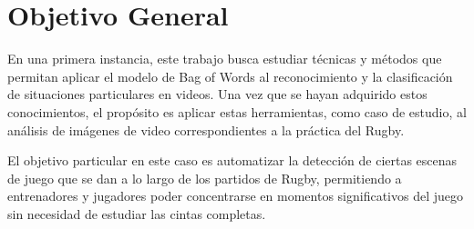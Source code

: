 \section{Objetivo General}
\iffalse
Explique el problema o situación de referencia en el que se desarrolla la
propuesta o los interrogantes en el campo disciplinario a los que la propuesta se
dirige. Desarrolle la importancia e impacto de los objetivos y el conocimiento
que se generará. En esta sección no es necesario describir las tareas específicas
que se realizarán (para eso, ver Objetivos específicos).
\fi
En una primera instancia, este trabajo busca estudiar técnicas y métodos que permitan aplicar el modelo de Bag of Words
al reconocimiento y la clasificación de situaciones particulares en videos. 
Una vez que se hayan adquirido estos conocimientos, el propósito es aplicar estas herramientas, como caso de estudio, al análisis de imágenes
de video correspondientes a la práctica del Rugby.

El objetivo particular en este caso es automatizar la detección de ciertas escenas de juego que se dan a lo largo de los partidos de Rugby, permitiendo a entrenadores
y jugadores poder concentrarse en momentos significativos del juego sin necesidad de estudiar las cintas completas.